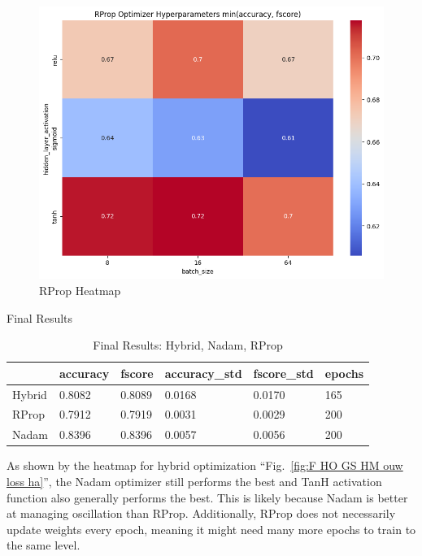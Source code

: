 \documentclass[conference]{IEEEtran}
\begin{document}
\FloatBarrier

\begin{figure}[htbp]
\centerline{\includegraphics[width=0.8\columnwidth]{Fs RProp GS HM acc.png}}
\caption{RProp Heatmap}
\label{fig:Fs RProp GS HM acc}
\end{figure}

\FloatBarrier

\newpage

Final Results

\begin{table}[!ht]
    \centering
    \begin{tabular}{|l|l|l|l|l|l|} \hline 
    
        & accuracy & fscore & accuracy\_std & fscore\_std & epochs \\ \hline  
        Hybrid & 0.8082 & 0.8089 & 0.0168 & 0.0170 & 165 \\ \hline  
        RProp & 0.7912 & 0.7919 & 0.0031 & 0.0029 & 200 \\ \hline  
        Nadam & 0.8396 & 0.8396 & 0.0057 & 0.0056 & 200 \\ \hline 
    \end{tabular}
    \caption{Final Results: Hybrid, Nadam, RProp}
    \label{tab:FinalResults}
\end{table}

\FloatBarrier

As shown by the heatmap for hybrid optimization ``Fig.~\ref{fig:F HO GS HM ouw loss ha}'', the Nadam optimizer still performs the best and TanH activation function also generally performs the best. This is likely because Nadam is better at managing oscillation than RProp. Additionally, RProp does not necessarily update weights every epoch, meaning it might need many more epochs to train to the same level.
\end{document}
